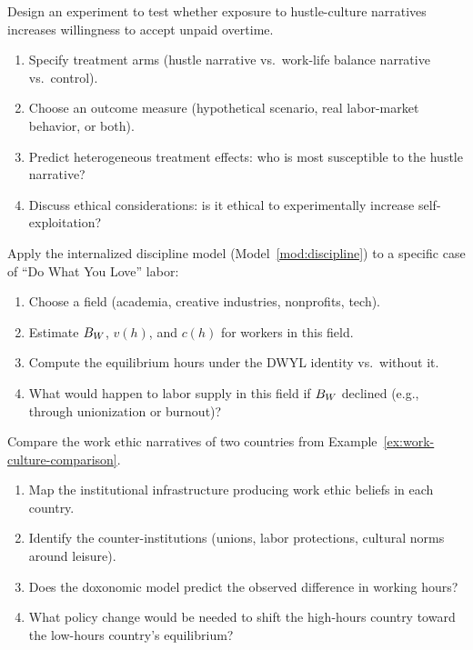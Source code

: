 \begin{exercise}
Design an experiment to test whether exposure to hustle-culture narratives increases willingness to accept unpaid overtime.
\begin{enumerate}[nosep]
  \item Specify treatment arms (hustle narrative vs.\ work-life balance narrative vs.\ control).
  \item Choose an outcome measure (hypothetical scenario, real labor-market behavior, or both).
  \item Predict heterogeneous treatment effects: who is most susceptible to the hustle narrative?
  \item Discuss ethical considerations: is it ethical to experimentally increase self-exploitation?
\end{enumerate}
\end{exercise}

\begin{exercise}
Apply the internalized discipline model (Model~\ref{mod:discipline}) to a specific case of ``Do What You Love'' labor:
\begin{enumerate}[nosep]
  \item Choose a field (academia, creative industries, nonprofits, tech).
  \item Estimate $B_{W}$, $v(h)$, and $c(h)$ for workers in this field.
  \item Compute the equilibrium hours under the DWYL identity vs.\ without it.
  \item What would happen to labor supply in this field if $B_{W}$ declined (e.g., through unionization or burnout)?
\end{enumerate}
\end{exercise}

\begin{exercise}
Compare the work ethic narratives of two countries from Example~\ref{ex:work-culture-comparison}.
\begin{enumerate}[nosep]
  \item Map the institutional infrastructure producing work ethic beliefs in each country.
  \item Identify the counter-institutions (unions, labor protections, cultural norms around leisure).
  \item Does the doxonomic model predict the observed difference in working hours?
  \item What policy change would be needed to shift the high-hours country toward the low-hours country's equilibrium?
\end{enumerate}
\end{exercise}

